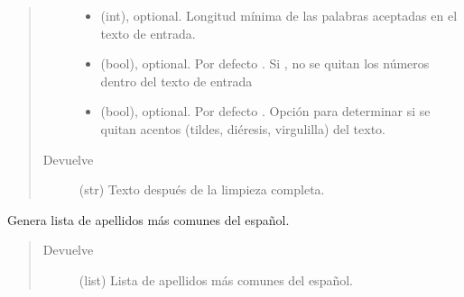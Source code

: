 \documentclass[letterpaper,10pt,openany,spanish]{sphinxmanual}
\begin{document}
\begin{fulllineitems}
\begin{quote}
\begin{description}
\begin{itemize}
\item {} 
 \textendash{} (int), optional. Longitud mínima de las palabras aceptadas en el texto de entrada.

\item {} 
 \textendash{} (bool), optional. Por defecto . Si , no se quitan los números dentro         del texto de entrada

\item {} 
 \textendash{} (bool), optional. Por defecto . Opción para determinar si se quitan         acentos (tildes, diéresis, virgulilla) del texto.

\end{itemize}

\item[{Devuelve}] \leavevmode
(str) Texto después de la limpieza completa.

\end{description}\end{quote}

\end{fulllineitems}


\begin{fulllineitems}
\label{\detokenize{funciones/limpieza:limpieza.lista_apellidos}}
Genera lista de apellidos más comunes del español.
\begin{quote}\begin{description}
\item[{Devuelve}] \leavevmode
(list) Lista de apellidos más comunes del español.

\end{description}\end{quote}

\end{fulllineitems}

\end{document}
